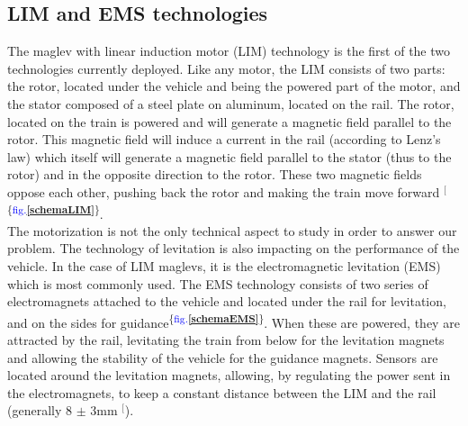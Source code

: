 \documentclass[12pt, a4paper, onecolumn]{article}
\makeatletter
\renewcommand{\tab}{\tabto{15px}}
\newcommand{\csvdel}{}
\newcommand{\bettercite}[1][,]{%
  \renewcommand{\csvdel}{\renewcommand{\csvdel}{}}%
  \csname\endcsname$^[$\checknextarg}
\newcommand{\checknextarg}{\@ifnextchar\bgroup{\gobblenext}{}}%
\newcommand{\gobblenext}[1]{\csvdel\textcolor{blue}{\textbf{\cite{#1}}}\@ifnextchar\bgroup{$^,$\gobblenext}{$^]$}}%
\newcommand{\cffig}[1]{\textsuperscript{\{\textcolor{blue}{fig.\textbf{\ref{#1}}}\}}}
\makeatother
\begin{document}
\subsection{LIM and EMS technologies}
\tab The maglev with linear induction motor (LIM) technology is the first of the two technologies currently deployed.
Like any motor, the LIM consists of two parts: the rotor, located under the vehicle and being the powered part of the motor, and the stator composed of a steel plate on aluminum, located on the rail.
The rotor, located on the train is powered and will generate a magnetic field parallel to the rotor.
This magnetic field will induce a current in the rail (according to Lenz's law) which itself will generate a magnetic field parallel to the stator (thus to the rotor) and in the opposite direction to the rotor.
These two magnetic fields oppose each other, pushing back the rotor and making the train move forward\bettercite{coloradomaglev}\cffig{schemaLIM}. \\
\linebreak
\tab The motorization is not the only technical aspect to study in order to answer our problem.
The technology of levitation is also impacting on the performance of the vehicle.
In the case of LIM maglevs, it is the electromagnetic levitation (EMS) which is most commonly used.
The EMS technology consists of two series of electromagnets attached to the vehicle and located under the rail for levitation, and on the sides for guidance\cffig{schemaEMS}.
When these are powered, they are attracted by the rail, levitating the train from below for the levitation magnets and allowing the stability of the vehicle for the guidance magnets.
Sensors are located around the levitation magnets, allowing, by regulating the power sent in the electromagnets, to keep a constant distance between the LIM and the rail (generally 8 $\pm$ 3mm\bettercite{koreamaglevprogram}). \\
\end{document}
